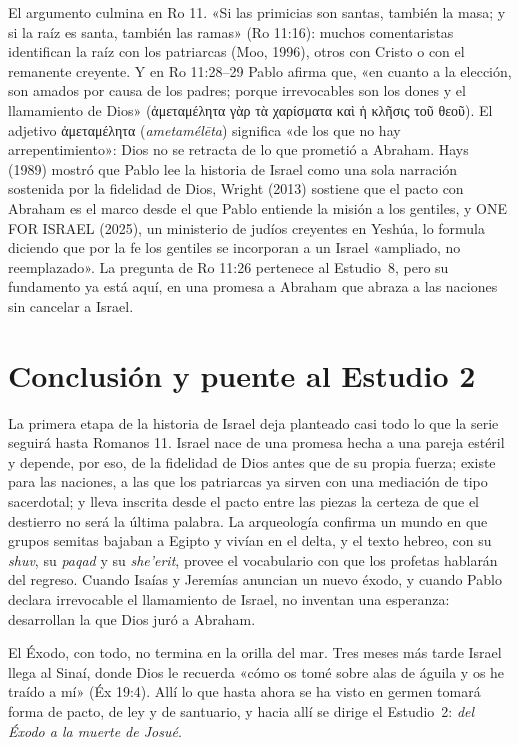\documentclass[11pt,letterpaper]{article}
\newcommand{\grc}[1]{\foreignlanguage{ancientgreek}{#1}}
\begin{document}
El argumento culmina en Ro 11. «Si las primicias son santas, también la masa; y si la raíz es santa, también las ramas» (Ro 11:16): muchos comentaristas identifican la raíz con los patriarcas (Moo, 1996), otros con Cristo o con el remanente creyente. Y en Ro 11:28–29 Pablo afirma que, «en cuanto a la elección, son amados por causa de los padres; porque irrevocables son los dones y el llamamiento de Dios» (\grc{ἀμεταμέλητα γὰρ τὰ χαρίσματα καὶ ἡ κλῆσις τοῦ θεοῦ}). El adjetivo \grc{ἀμεταμέλητα} (\emph{ametamélēta}) significa «de los que no hay arrepentimiento»: Dios no se retracta de lo que prometió a Abraham. Hays (1989) mostró que Pablo lee la historia de Israel como una sola narración sostenida por la fidelidad de Dios, Wright (2013) sostiene que el pacto con Abraham es el marco desde el que Pablo entiende la misión a los gentiles, y ONE FOR ISRAEL (2025), un ministerio de judíos creyentes en Yeshúa, lo formula diciendo que por la fe los gentiles se incorporan a un Israel «ampliado, no reemplazado». La pregunta de Ro 11:26 pertenece al Estudio~8, pero su fundamento ya está aquí, en una promesa a Abraham que abraza a las naciones sin cancelar a Israel.

\section{Conclusión y puente al Estudio 2}

La primera etapa de la historia de Israel deja planteado casi todo lo que la serie seguirá hasta Romanos 11. Israel nace de una promesa hecha a una pareja estéril y depende, por eso, de la fidelidad de Dios antes que de su propia fuerza; existe para las naciones, a las que los patriarcas ya sirven con una mediación de tipo sacerdotal; y lleva inscrita desde el pacto entre las piezas la certeza de que el destierro no será la última palabra. La arqueología confirma un mundo en que grupos semitas bajaban a Egipto y vivían en el delta, y el texto hebreo, con su \emph{shuv}, su \emph{paqad} y su \emph{she'erit}, provee el vocabulario con que los profetas hablarán del regreso. Cuando Isaías y Jeremías anuncian un nuevo éxodo, y cuando Pablo declara irrevocable el llamamiento de Israel, no inventan una esperanza: desarrollan la que Dios juró a Abraham.

El Éxodo, con todo, no termina en la orilla del mar. Tres meses más tarde Israel llega al Sinaí, donde Dios le recuerda «cómo os tomé sobre alas de águila y os he traído a mí» (Éx 19:4). Allí lo que hasta ahora se ha visto en germen tomará forma de pacto, de ley y de santuario, y hacia allí se dirige el Estudio~2: \emph{del Éxodo a la muerte de Josué}.
\end{document}
